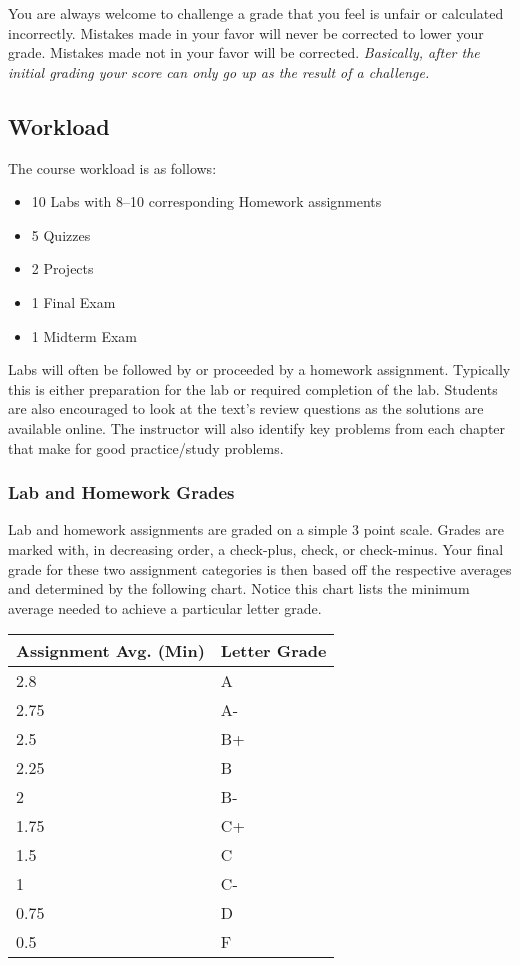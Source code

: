 \documentclass[10pt]{article}
\begin{document}
You are always welcome to challenge a grade that you feel is unfair or calculated incorrectly.  Mistakes made in your favor will never be corrected to lower your grade.  Mistakes made not in your favor will be corrected.  \textit{Basically, after the initial grading your score can only go up as the result of a challenge.}

\subsection{Workload}

The course workload is as follows:
\begin{itemize}
\item 10 Labs with 8--10 corresponding Homework assignments
\item 5 Quizzes
\item 2 Projects
\item 1 Final Exam
\item 1 Midterm Exam
\end{itemize}

Labs will often be followed by or proceeded by a homework assignment.  Typically this is either preparation for the lab or required completion of the lab. Students are also encouraged to look at the text's review questions as the solutions are available online.  The instructor will also identify key problems from each chapter that make for good practice/study problems.

\subsubsection{Lab and Homework Grades}

Lab and homework assignments are graded on a simple 3 point scale. Grades are marked with, in decreasing order, a check-plus, check, or check-minus. Your final grade for these two assignment categories is then based off the respective averages and determined by the following chart.  Notice this chart lists the minimum average needed to achieve a particular letter grade.

\begin{center}
\begin{small}
\begin{tabular}{ll}
Assignment Avg. (Min) & Letter Grade \\ \toprule
2.8   & A  \\
2.75    & A- \\
2.5 & B+ \\
2.25    & B  \\
2   & B- \\
1.75    & C+ \\
1.5 & C  \\
1   & C- \\
0.75    & D  \\
0.5  & F
\end{tabular}
\end{small}
\end{center}
\end{document}
